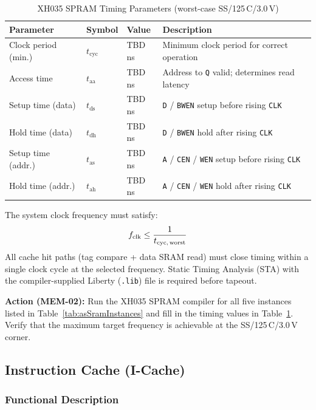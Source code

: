 \begin{table}[H]
\caption{XH035 SPRAM Timing Parameters (worst-case SS/125\,\textdegree C/3.0\,V)}
\label{tab:asSramTiming}
\centering
\begin{tabularx}{\textwidth}{|l |l |l |X|}
  \hline
  Parameter & Symbol & Value & Description \\
  \hline
  \hline
  Clock period (min.) & $t_\text{cyc}$ & TBD\,ns & Minimum clock period for correct operation \\
  \hline
  Access time         & $t_\text{aa}$  & TBD\,ns & Address to \texttt{Q} valid; determines read latency \\
  \hline
  Setup time (data)   & $t_\text{ds}$  & TBD\,ns & \texttt{D} / \texttt{BWEN} setup before rising \texttt{CLK} \\
  \hline
  Hold time (data)    & $t_\text{dh}$  & TBD\,ns & \texttt{D} / \texttt{BWEN} hold after rising \texttt{CLK} \\
  \hline
  Setup time (addr.)  & $t_\text{as}$  & TBD\,ns & \texttt{A} / \texttt{CEN} / \texttt{WEN} setup before rising \texttt{CLK} \\
  \hline
  Hold time (addr.)   & $t_\text{ah}$  & TBD\,ns & \texttt{A} / \texttt{CEN} / \texttt{WEN} hold after rising \texttt{CLK} \\
  \hline
\end{tabularx}
\end{table}

The system clock frequency must satisfy:
\[
  f_\text{clk} \leq \frac{1}{t_\text{cyc,\,worst}}
\]
All cache hit paths (tag compare + data SRAM read) must close timing
within a single clock cycle at the selected frequency.
Static Timing Analysis (STA) with the compiler-supplied Liberty
(\texttt{.lib}) file is required before tapeout.

\textbf{Action (MEM-02):} Run the XH035 SPRAM compiler for all five
instances listed in Table~\ref{tab:asSramInstances} and fill in the
timing values in Table~\ref{tab:asSramTiming}.
Verify that the maximum target frequency is achievable at the SS/125\,\textdegree C/3.0\,V corner.

\subsection{Instruction Cache (I-Cache)}

\subsubsection{Functional Description}

